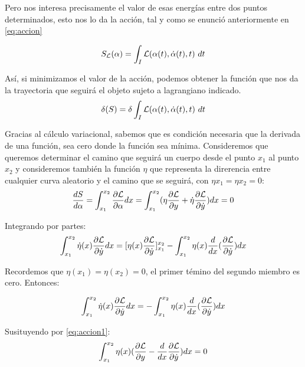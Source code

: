 Pero nos interesa precisamente el valor de esas energías entre dos puntos determinados, esto nos lo da la acción, tal y como se enunció anteriormente en \eqref{eq:accion}

\begin{equation}
	S_{\mathcal{L}}(\alpha) = \int_{I}\mathcal{L}(\alpha(t), \dot{\alpha}(t), t)\ dt
\end{equation}

Así, si minimizamos el valor de la acción, podemos obtener la función que nos da la trayectoria que seguirá el objeto sujeto a lagrangiano indicado.
\begin{equation}
    \delta(S) = \delta \int_{I}\mathcal{L}(\alpha(t), \dot{\alpha}(t), t)\ dt
\end{equation}

Gracias al cálculo variacional, sabemos que es condición necesaria que la derivada de una función, sea cero donde la función sea mínima. Consideremos que queremos determinar el camino que seguirá un cuerpo desde el punto $x_1$ al punto $x_2$ y consideremos también la función $\eta$ que representa la direrencia entre cualquier curva aleatorio y el camino que se seguirá, con $\eta{x_1} = \eta{x_2} = 0$:
\begin{equation}
    \label{eq:accion1}
    \frac{dS}{d\alpha} = \int_{x_1}^{x_2}\frac{\partial\mathcal{L}}{\partial\alpha}dx = \int_{x_1}^{x_2}(\eta\frac{\partial\mathcal{L}}{\partial y} + \dot{\eta}\frac{\partial\mathcal{L}}{\partial\dot{y}})dx = 0
\end{equation}

Integrando por partes:
\begin{equation}
    \int_{x_1}^{x_2}\dot{\eta}(x)\frac{\partial\mathcal{L}}{\partial\dot{y}}dx = [\eta(x)\frac{\partial\mathcal{L}}{\partial\dot{y}}]_{x_1}^{x_2} - \int_{x_1}^{x_2}\eta(x)\frac{d}{dx}(\frac{\partial\mathcal{L}}{\partial\dot{y}})dx
\end{equation}

Recordemos que $\eta(x_1) = \eta(x_2) = 0$, el primer témino del segundo miembro es cero. Entonces:

\begin{equation}
    \int_{x_1}^{x_2}\dot{\eta}(x)\frac{\partial\mathcal{L}}{\partial\dot{y}}dx = - \int_{x_1}^{x_2}\eta(x)\frac{d}{dx}(\frac{\partial\mathcal{L}}{\partial\dot{y}})dx
\end{equation}

Susituyendo por \eqref{eq:accion1}:
\begin{equation}
    \int_{x_1}^{x_2}\eta(x)(\frac{\partial\mathcal{L}}{\partial y} - \frac{d}{dx}\frac{\partial\mathcal{L}}{\partial\dot{y}})dx = 0
\end{equation}

